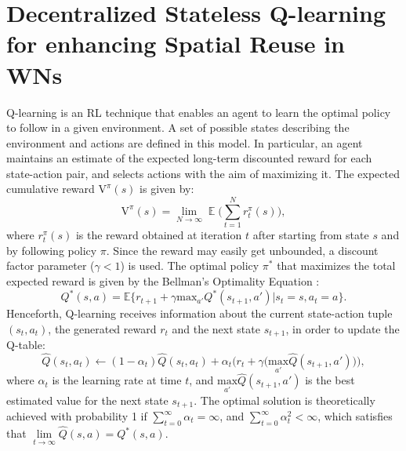 \documentclass{article}
\begin{document}
	\section{Decentralized Stateless Q-learning for enhancing Spatial Reuse in WNs}
	\label{section:qlearning}	
	Q-learning \cite{watkins1992q} is an RL technique that enables an agent to learn the optimal policy to follow in a given environment. A set of possible states describing the environment and actions are defined in this model. In particular, an agent maintains an estimate of the expected long-term discounted reward for each state-action pair, and selects actions with the aim of maximizing it. The expected cumulative reward $\text{V}^\pi(s)$ is given by:
	\begin{equation}
	\label{eq:ql_reward_policy}
	\text{V}^\pi(s) = \lim_{N \rightarrow \infty} \mathop{\mathbb{E}}\Big(\sum_{t=1}^{N} r_t^\pi(s)\Big),
	\nonumber
	\end{equation}
	where $r_t^\pi(s)$ is the reward obtained at iteration $t$ after starting from state $s$ and by following policy $\pi$. Since the reward may easily get unbounded, a discount factor parameter ($\gamma < 1$) is used. The optimal policy $\pi^*$ that maximizes the total expected reward is given by the Bellman's Optimality Equation \cite{sutton1998reinforcement}:	
	\begin{equation}
	Q^*(s,a) = \mathbb{E} \Big\{r_{t+1} + \gamma \text{max}_{a'} Q^*(s_{t+1},a') | s_t = s, a_t = a\Big\}. \nonumber
	\end{equation}	
	Henceforth, Q-learning receives information about the current state-action tuple $(s_t,a_t)$, the generated reward $r_t$ and the next state $s_{t+1}$, in order to update the Q-table: 	
	\begin{equation}
	\hat{Q}(s_t,a_t)\leftarrow (1-\alpha_t) \hat{Q}(s_t,a_t) + \alpha_t \Big(r_t + \gamma \big(\underset{a'}{\text{max}}\hat{Q}(s_{t+1},a')\big)\Big),
	\nonumber
	\end{equation}	
	where $\alpha_t$ is the learning rate at time $t$, and $\underset{a'}{\text{max}}\hat{Q}(s_{t+1},a')$ is the best estimated value for the next state $s_{t+1}$. The optimal solution is 
	theoretically
	achieved with probability 1 if $\sum_{t=0}^{\infty} \alpha_t = \infty$, and $\sum_{t=0}^{\infty} \alpha_t^2 < \infty$, which satisfies that $\underset{t \rightarrow \infty}{\lim} \hat{Q}(s,a) = Q^*(s,a)$.
\end{document}

